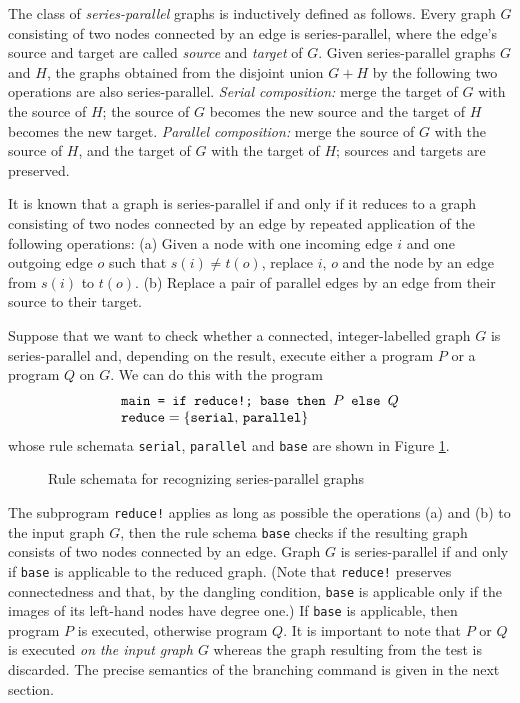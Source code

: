 \begin{example}
\label{ex:series-parallel}

The class of \emph{series-parallel}\/ graphs is inductively defined as follows. Every graph $G$ consisting of two nodes connected by an edge is series-parallel, where the edge's source and target are called \emph{source} and \emph{target}\/ of $G$. Given series-parallel graphs $G$ and $H$, the graphs obtained from the disjoint union $G + H$\/ by the following two operations are also series-parallel. \emph{Serial composition:}\/ merge the target of $G$ with the source of $H$; the source of $G$ becomes the new source and the target of $H$\/ becomes the new target. \emph{Parallel composition:}\/ merge the source of $G$ with the source of $H$, and the target of $G$ with the target of $H$; sources and targets are preserved.

It is known \cite{Bang_Jensen-Gutin00a,Duffin65a} that a graph is series-parallel if and only if it reduces to a graph consisting of two nodes connected by an edge by repeated application of the following operations: (a) Given a node with one incoming edge $i$ and one outgoing edge $o$ such that $s(i) \neq t(o)$, replace $i$, $o$ and the node by an edge from $s(i)$ to $t(o)$. (b) Replace a pair of parallel edges by an edge from their source to their target. 

Suppose that we want to check whether a connected, integer-labelled graph $G$ is series-parallel and, depending on the result, execute either a program $P$\/ or a program $Q$ on $G$. We can do this with the program
\[ \begin{array}{l}
    \text{\texttt{main = if reduce!; base then $P$\/ else $Q$}}\\
    \mathtt{reduce} = \{\mathtt{serial,\, parallel}\}
   \end{array} \]
whose rule schemata \texttt{serial}, \texttt{parallel} and \texttt{base} are shown in Figure \ref{fig:series-parallel}. 

\begin{figure}[htb]
 \begin{center}
  
 \end{center}
\caption{Rule schemata for recognizing series-parallel graphs}
\label{fig:series-parallel}
\end{figure}

The subprogram \texttt{reduce!} applies as long as possible the operations (a) and (b) to the input graph $G$, then the rule schema \texttt{base} checks if the resulting graph consists of two nodes connected by an edge. Graph $G$ is series-parallel if and only if \texttt{base} is applicable to the reduced graph. (Note that \texttt{reduce!} preserves connectedness and that, by the dangling condition, \texttt{base} is applicable only if the images of its left-hand nodes have degree one.) If \texttt{base} is applicable, then program $P$\/ is executed, otherwise program $Q$. It is important to note that $P$\/ or $Q$ is executed \emph{on the input graph $G$}\/ whereas the graph resulting from the test is discarded. The precise semantics of the branching command is given in the next section.


\end{example}
